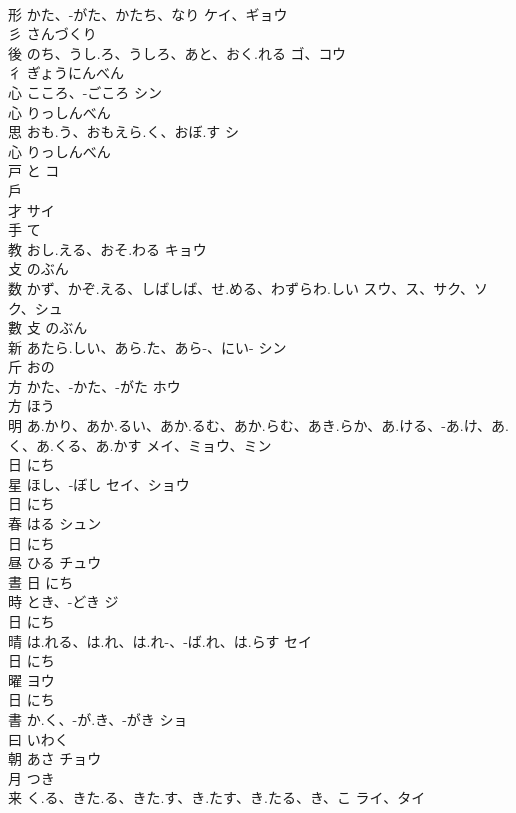 \documentclass[8pt]{extreport}
\begin{document}
\begin{CJK}{UTF8}{min}
\\	形	かた、-がた、かたち、なり	ケイ、ギョウ	
\\	彡		さんづくり		
\\	後	のち、うし.ろ、うしろ、あと、おく.れる	ゴ、コウ	
\\	彳		ぎょうにんべん		
\\	心	こころ、-ごころ	シン	
\\	心		りっしんべん		
\\	思	おも.う、おもえら.く、おぼ.す	シ	
\\	心		りっしんべん		
\\	戸	と	コ	
\\	戶				
\\	才		サイ	
\\	手		て		
\\	教	おし.える、おそ.わる	キョウ	
\\	攴		のぶん		
\\	数	かず、かぞ.える、しばしば、せ.める、わずらわ.しい	スウ、ス、サク、ソク、シュ	
\\	數	攴		のぶん		
\\	新	あたら.しい、あら.た、あら-、にい-	シン	
\\	斤		おの		
\\	方	かた、-かた、-がた	ホウ	
\\	方		ほう		
\\	明	あ.かり、あか.るい、あか.るむ、あか.らむ、あき.らか、あ.ける、-あ.け、あ.く、あ.くる、あ.かす	メイ、ミョウ、ミン	
\\	日		にち		
\\	星	ほし、-ぼし	セイ、ショウ	
\\	日		にち		
\\	春	はる	シュン	
\\	日		にち		
\\	昼	ひる	チュウ	
\\	晝	日		にち		
\\	時	とき、-どき	ジ	
\\	日		にち		
\\	晴	は.れる、は.れ、は.れ-、-ば.れ、は.らす	セイ	
\\	日		にち		
\\	曜		ヨウ	
\\	日		にち		
\\	書	か.く、-が.き、-がき	ショ	
\\	曰		いわく		
\\	朝	あさ	チョウ	
\\	月		つき		
\\	来	く.る、きた.る、きた.す、き.たす、き.たる、き、こ	ライ、タイ	

\end{CJK}
\end{document}
